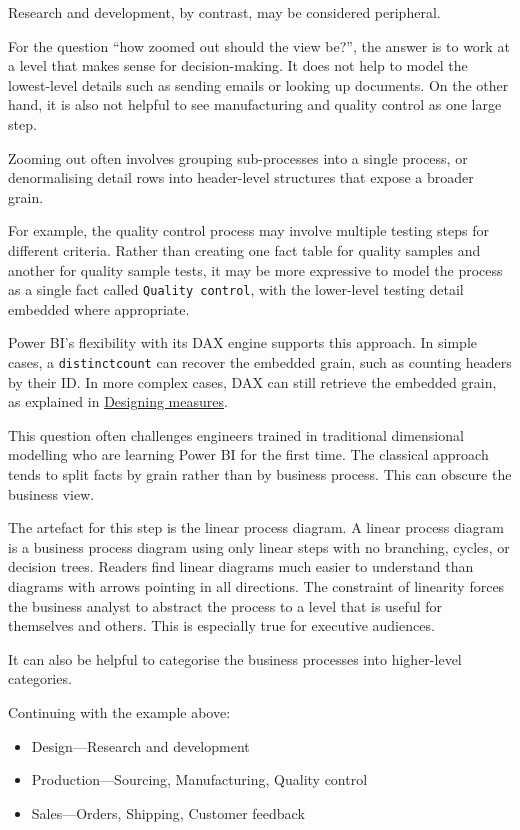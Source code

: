 \documentclass[10pt,openany,10pt]{book}
\providecommand{\tightlist}{%
  \setlength{\itemsep}{0pt}\setlength{\parskip}{0pt}}
\begin{document}
Research and development, by contrast, may be considered peripheral.

For the question ``how zoomed out should the view be?'', the answer is
to work at a level that makes sense for decision-making. It does not
help to model the lowest-level details such as sending emails or looking
up documents. On the other hand, it is also not helpful to see
manufacturing and quality control as one large step.

Zooming out often involves grouping sub-processes into a single process,
or denormalising detail rows into header-level structures that expose a
broader grain.

For example, the quality control process may involve multiple testing
steps for different criteria. Rather than creating one fact table for
quality samples and another for quality sample tests, it may be more
expressive to model the process as a single fact called
\texttt{\textquotesingle{}Quality\ control\textquotesingle{}}, with the
lower-level testing detail embedded where appropriate.

Power BI's flexibility with its DAX engine supports this approach. In
simple cases, a \texttt{distinctcount} can recover the embedded grain,
such as counting headers by their ID. In more complex cases, DAX can
still retrieve the embedded grain, as explained in
\hyperref[docs-presenting-insights-designing-measures]{Designing
measures}.

This question often challenges engineers trained in traditional
dimensional modelling who are learning Power BI for the first time. The
classical approach tends to split facts by grain rather than by business
process. This can obscure the business view.

The artefact for this step is the linear process diagram. A linear
process diagram is a business process diagram using only linear steps
with no branching, cycles, or decision trees. Readers find linear
diagrams much easier to understand than diagrams with arrows pointing in
all directions. The constraint of linearity forces the business analyst
to abstract the process to a level that is useful for themselves and
others. This is especially true for executive audiences.

It can also be helpful to categorise the business processes into
higher-level categories.

Continuing with the example above:

\begin{itemize}
\tightlist
\item
  Design---Research and development
\item
  Production---Sourcing, Manufacturing, Quality control
\item
  Sales---Orders, Shipping, Customer feedback
\end{itemize}
\end{document}
